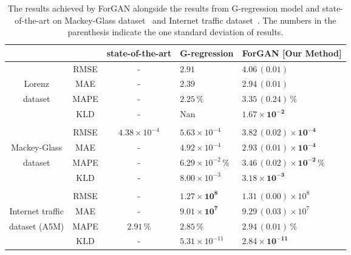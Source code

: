 \documentclass{ieeeaccess}
\begin{document}
\begin{table*}
	\caption{The results achieved by ForGAN alongside the results from G-regression model and state-of-the-art on Mackey-Glass dataset~\cite{mendez2017competitive} and Internet traffic dataset~\cite{cortez2012multi}. The numbers in the parenthesis indicate the one standard deviation of results.}
	\label{tab:all_res}
	\small \centering
	\begin{tabular}{c|ccllcl}
		\toprule
		\multicolumn{2}{c}{ }& \textbf{state-of-the-art} &\textbf{G-regression} &\multicolumn{3}{c}{ForGAN [\textbf{Our Method}]}\\
		\midrule
		&RMSE	& -    &$\mathbf{2.91}$	&$4.06\,(0.01)$	 \\
		Lorenz	&MAE    & -    &$\mathbf{2.39}$	        &$2.94\,(0.01)$	 \\
		dataset &MAPE	& -    &$\mathbf{2.25\,\%}$	    &$3.35\,(0.24)\, \%$ \\
		&KLD    & -    &Nan 	        &$\mathbf{1.67\times10^{-2}}$	     \\
		
		\multicolumn{2}{c}{ }\\
		
		&RMSE    & $4.38\times10^{-4}$    &$5.63\times10^{-4}$        &$\mathbf{3.82\,(0.02)\times10^{-4}}$    \\
		Mackey-Glass &MAE     & -                      &$4.92\times10^{-4}$        &$\mathbf{2.93\,(0.01)\times10^{-4}}$    \\
		dataset      &MAPE    & -                      &$6.29\times10^{-2}\,\%$    &$\mathbf{3.46\,(0.02)\times10^{-2}\,\%}$ \\
		&KLD     & -                      &$8.00\times10^{-3}$        &$\mathbf{3.18\times10^{-3}}$    \\
		
		\multicolumn{2}{c}{ }\\
		
		&RMSE    & -          &$\mathbf{1.27\times10^{8}}$  &$1.31\,(0.00)\times10^{8}$  \\
		Internet traffic    &MAE     & -          &$\mathbf{9.01\times10^{7}}$  &$9.29\,(0.03)\times10^{7}$  \\
		dataset (A5M)       &MAPE    &$2.91\,\%$  &$\mathbf{2.85\,\%}$ &$2.94\,(0.01)\,\%$  \\
		&KLD     & -          &$5.31\times10^{-11}$               &$\mathbf{2.84\times10^{-11}}$ \\
		
		\bottomrule
	\end{tabular}
\end{table*}
\medskip
\end{document}
